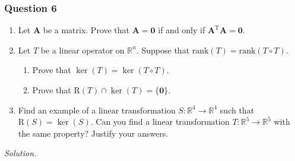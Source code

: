 \documentclass[12pt]{article}
\begin{document}
\subsubsection*{Question 6}
\begin{enumerate}[label=\textbf{(\alph*)}]
\itemsep 0em
    \item Let \( \mathbf{A} \) be a matrix. Prove that \( \mathbf{A}=\mathbf{0} \) if and only if \( \mathbf{A}^\text{T}\mathbf{A} = \mathbf{0} \).
    \item Let \( T \) be a linear operator on \( \mathbb{R}^n \). Suppose that \( \mathrm{rank}(T) = \mathrm{rank}(T \circ T) \).
    \begin{enumerate}[label=\textbf{(\roman*)}]
    \itemsep 0em
        \item Prove that \( \ker(T) = \ker(T \circ T) \).
        \item Prove that \( \mathrm{R}(T) \cap \ker(T) = \{\mathbf{0}\} \).
    \end{enumerate}
    \item Find an example of a linear transformation \( S : \mathbb{R}^4 \to \mathbb{R}^4 \) such that \( \mathrm{R}(S) = \ker(S) \). Can you find a linear transformation \( T : \mathbb{R}^5 \to \mathbb{R}^5 \) with the same property? Justify your answers.
\end{enumerate}
\textit{Solution.}
\end{document}
